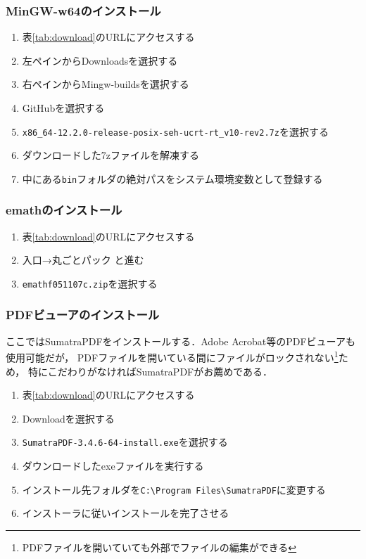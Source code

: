 \subsubsection{MinGW-w64のインストール}
\begin{enumerate}
    \item 表\ref{tab:download}のURLにアクセスする
    \item 左ペインからDownloadsを選択する
    \item 右ペインからMingw-buildsを選択する
    \item GitHubを選択する
    \item \verb|x86_64-12.2.0-release-posix-seh-ucrt-rt_v10-rev2.7z|を選択する
    \item ダウンロードした7zファイルを解凍する
    \item 中にある\verb|bin|フォルダの絶対パスをシステム環境変数として登録する
\end{enumerate}

\subsubsection{emathのインストール}
\begin{enumerate}
    \item 表\ref{tab:download}のURLにアクセスする
    \item 入口→丸ごとパック と進む
    \item \verb|emathf051107c.zip|を選択する
\end{enumerate}

\subsubsection{PDFビューアのインストール}
ここではSumatraPDFをインストールする．Adobe Acrobat等のPDFビューアも使用可能だが，
PDFファイルを開いている間にファイルがロックされない\footnote{PDFファイルを開いていても外部でファイルの編集ができる}ため，
特にこだわりがなければSumatraPDFがお薦めである．
\begin{enumerate}
    \item 表\ref{tab:download}のURLにアクセスする
    \item Downloadを選択する
    \item \verb|SumatraPDF-3.4.6-64-install.exe|を選択する
    \item ダウンロードしたexeファイルを実行する
    \item インストール先フォルダを\verb|C:\Program Files\SumatraPDF|に変更する
    \item インストーラに従いインストールを完了させる
\end{enumerate}

